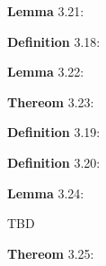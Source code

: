 \documentclass{article}
\begin{document}
\par 
\textbf{Lemma} 3.21:
\newline


\par 
\textbf{Definition} 3.18:
\newline

\par 
\textbf{Lemma} 3.22:
\newline

\par 
\textbf{Thereom} 3.23:
\newline

\par 
\textbf{Definition} 3.19:
\newline

\par 
\textbf{Definition} 3.20:
\newline

\par 
\textbf{Lemma} 3.24:
\newline

TBD

\par 
\textbf{Thereom} 3.25:
\newline
\end{document}
